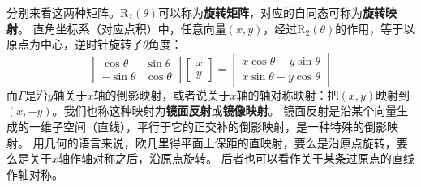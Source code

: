 \documentclass[12pt,UTF8,fontset=none]{ctexbook}
\begin{document}
分别来看这两种矩阵。$\mathrm{R}_2(\theta)$可以称为\textbf{旋转矩阵}，对应的自同态可称为\textbf{旋转映射}。
直角坐标系（对应点积）中，任意向量$(x, y)$，经过$\mathrm{R}_2(\theta)$的作用，等于以原点为中心，逆时针旋转了$\theta$角度：
$$\begin{bmatrix}\cos{\theta} & \sin{\theta} \\ -\sin{\theta} & \cos{\theta}\end{bmatrix} \begin{bmatrix} x \\ y\end{bmatrix} = \begin{bmatrix}x\cos{\theta} - y\sin{\theta} \\ x\sin{\theta} + y\cos{\theta}\end{bmatrix} $$
而$\Gamma$是沿$y$轴关于$x$轴的倒影映射，或者说关于$x$轴的轴对称映射：把$(x,y)$映射到$(x, -y)$。我们也称这种映射为\textbf{镜面反射}或\textbf{镜像映射}。
镜面反射是沿某个向量生成的一维子空间（直线），平行于它的正交补的倒影映射，是一种特殊的倒影映射。
用几何的语言来说，欧几里得平面上保距的直映射，要么是沿原点旋转，要么是关于$x$轴作轴对称之后，沿原点旋转。
后者也可以看作关于某条过原点的直线作轴对称。
\end{document}

